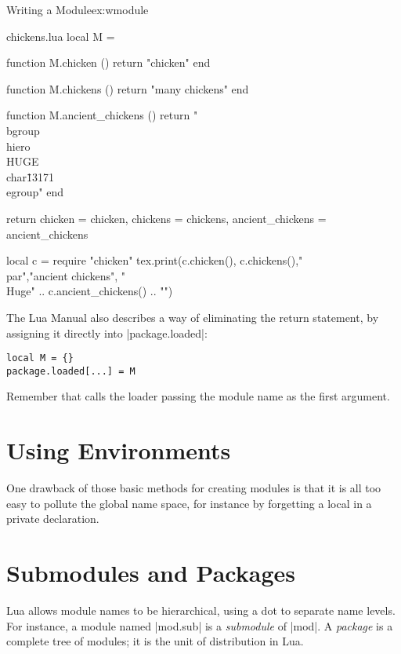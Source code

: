 \begin{texexample}{Writing a Module}{ex:wmodule}
\begin{filecontents*}{chickens.lua}
local M = {}

function M.chicken ()
  return "chicken"
end

function M.chickens ()
  return "many chickens" 
end

function M.ancient_chickens ()
  return "\\bgroup\\hiero\\HUGE\\char\"13171 \\egroup"
end

return {chicken           = chicken,
        chickens          = chickens,
        ancient_chickens  = ancient_chickens}
\end{filecontents*}

\begin{luacode*}
   local c = require "chicken"
   tex.print(c.chicken(), c.chickens(),"\\par","ancient chickens", "{\\Huge" .. c.ancient_chickens() .. "}")
\end{luacode*}
\end{texexample}



The Lua Manual also describes a way of eliminating the return statement, by assigning it directly into |package.loaded|:

\begin{verbatim}
local M = {}
package.loaded[...] = M
\end{verbatim}

Remember that  calls the loader passing the module name as the first argument.

\section{Using Environments}

One drawback of those basic methods for creating modules is that it is all too easy to pollute the global name space, for instance by forgetting a local in a private declaration.

\section{Submodules and Packages}

Lua allows module names to be hierarchical, using a dot to separate name levels. For instance, a module named |mod.sub| is a \textit{submodule} of |mod|. A \textit{package} is a complete tree of modules; it is the unit of distribution in Lua. 

